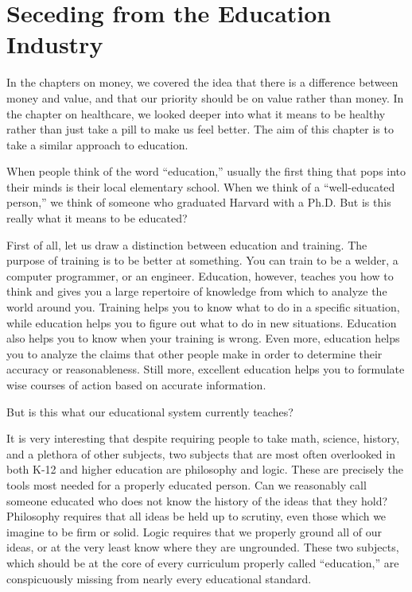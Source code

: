 \chapter{Seceding from the Education Industry}

In the chapters on money, we covered the idea that there is a difference
between money and value, and that our priority should be on value
rather than money. In the chapter on healthcare, we looked deeper into
what it means to be healthy rather than just take a pill to make
us feel better. The
aim of this chapter is to take a similar approach to education.

When people think of the word “education,” usually the first thing that
pops into their minds is their local elementary school. When we think
of a “well-educated person,” we think of someone who graduated Harvard
with a Ph.D. But is this really what it means to be educated?

First of all, let us draw a distinction between education and training.
The purpose of training is to be better at something. You can train to
be a welder, a computer programmer, or an engineer. Education, however,
teaches you how to think and gives you a large repertoire of knowledge
from which to analyze
the world around you. Training helps you to know what to do in a
specific situation, while education helps you to figure out what to do
in new situations. Education also helps you to know when your training
is wrong. Even more, education helps you to analyze the claims that
other people make in order to determine their accuracy or
reasonableness. Still more, excellent education helps you to formulate
wise courses of action based on accurate information.

But is this what our educational system currently teaches?

It is very interesting that despite requiring people to take math,
science, history, and a plethora of other subjects, two subjects that
are most often overlooked in both K-12 and higher education
are philosophy and logic. These are precisely the tools most
needed for a properly educated person. Can we reasonably call someone
educated who does not know the history of the ideas that they hold? 
Philosophy requires that all ideas be held up to scrutiny, even those
which we imagine to be firm or solid. Logic requires that we properly
ground all of our ideas, or at the very least know where they are
ungrounded. These two subjects, which should be at the core of every
curriculum properly called “education,” are conspicuously missing from
nearly every educational standard.

